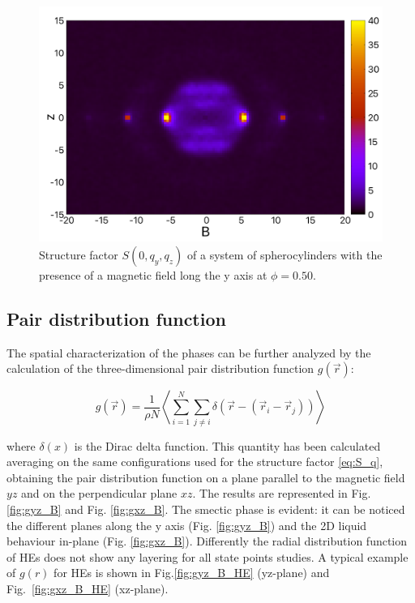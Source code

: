 \documentclass{article}
\begin{document}
\begin{figure}
    \centering
    \includegraphics[width=1\columnwidth]{Syz_B.png}
    \caption{Structure factor $S(0, q_y, q_z)$ of a system of spherocylinders with the presence of a magnetic field long the y axis at $\phi=0.50$.}
    \label{fig:Syz_B_HSC}
\end{figure}

\subsection{Pair distribution function}

The spatial characterization of the phases can be further analyzed by  the calculation of the three-dimensional pair distribution function $g(\vec{r})$:

\begin{equation}
    g(\vec{r}) = \frac{1}{\rho N} \left\langle \sum_{i=1}^N \sum_{j\neq i} \delta \left( \vec{r} - \left( \vec{r}_i - \vec{r}_j \right) \right) \right\rangle
\end{equation}

where $\delta(x)$ is the Dirac delta function. This quantity has been calculated averaging on the same configurations used for the structure factor \ref{eq:S_q}, obtaining the pair distribution function on a plane parallel to the magnetic field $yz$ and on the perpendicular plane $xz$. The results are represented in Fig. \ref{fig:gyz_B} and Fig. \ref{fig:gxz_B}. The smectic phase is evident: it can be noticed the different planes along the y axis (Fig. \ref{fig:gyz_B}) and the 2D liquid behaviour in-plane (Fig. \ref{fig:gxz_B}).
Differently the radial distribution function of HEs does not show any layering for all state points studies.
A typical example of $g(r)$ for HEs is shown in Fig.\ref{fig:gyz_B_HE} (yz-plane) and Fig.~\ref{fig:gxz_B_HE} (xz-plane). 
\end{document}
